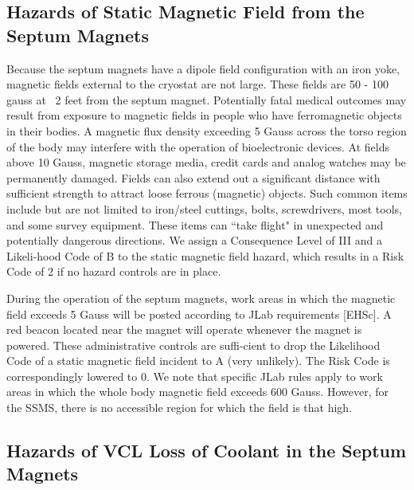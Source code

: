 \begin{safetyen}{10}{15}
\subsection {\bf Hazards of Static Magnetic Field from the Septum Magnets}
\end{safetyen}

Because the septum magnets have a dipole field configuration with an iron yoke, magnetic fields external to the 
cryostat are not large. These fields are 50 - 100 gauss 
at ~2 feet from the septum magnet. Potentially fatal medical outcomes may result from exposure to magnetic 
fields in people who have ferromagnetic objects in their bodies.  A magnetic flux density exceeding 5 Gauss 
across the torso region of the body may interfere with the operation of bioelectronic devices.  At fields 
above 10 Gauss, magnetic storage media, credit cards and analog watches may be permanently damaged.  Fields 
can also extend out a significant distance with sufficient strength to attract loose ferrous (magnetic) objects. 
Such common items include but are not limited to iron/steel cuttings, bolts, screwdrivers, most tools, and 
some survey equipment.  These items can ``take flight" in unexpected and potentially dangerous directions.  
We assign a Consequence Level of III and a Likeli-hood Code of B to the static magnetic field hazard, which 
results in a Risk Code of 2 if no hazard controls are in place.

During the operation of the septum magnets, work areas in which the magnetic field exceeds 5 Gauss will be 
posted according to JLab requirements [EHSc]. A red beacon located near the magnet will operate whenever 
the magnet is powered.  These administrative controls are suffi-cient to drop the Likelihood Code of a static 
magnetic field incident to A (very unlikely).  The Risk Code is correspondingly lowered to 0.  We note that
 specific JLab rules apply to work areas in which the whole body magnetic field exceeds 600 Gauss. However, 
for the SSMS, there is no accessible region for which the field is that high.

\begin{safetyen}{10}{15}
\subsection {\bf Hazards of VCL Loss of Coolant in the Septum Magnets}
\end{safetyen}


